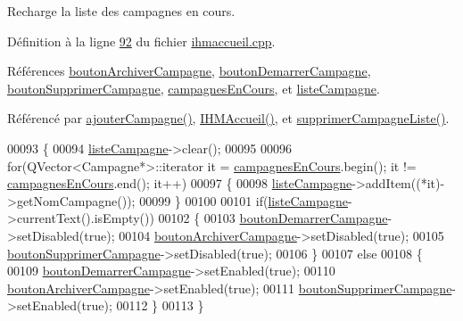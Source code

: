 Recharge la liste des campagnes en cours. 



Définition à la ligne \hyperlink{ihmaccueil_8cpp_source_l00092}{92} du fichier \hyperlink{ihmaccueil_8cpp_source}{ihmaccueil.\+cpp}.



Références \hyperlink{ihmaccueil_8h_source_l00035}{bouton\+Archiver\+Campagne}, \hyperlink{ihmaccueil_8h_source_l00034}{bouton\+Demarrer\+Campagne}, \hyperlink{ihmaccueil_8h_source_l00036}{bouton\+Supprimer\+Campagne}, \hyperlink{ihmaccueil_8h_source_l00039}{campagnes\+En\+Cours}, et \hyperlink{ihmaccueil_8h_source_l00037}{liste\+Campagne}.



Référencé par \hyperlink{ihmaccueil_8cpp_source_l00254}{ajouter\+Campagne()}, \hyperlink{ihmaccueil_8cpp_source_l00014}{I\+H\+M\+Accueil()}, et \hyperlink{ihmaccueil_8cpp_source_l00189}{supprimer\+Campagne\+Liste()}.


\begin{DoxyCode}
00093 \{
00094     \hyperlink{class_i_h_m_accueil_afb828a4e06c25afa40341c310cd85b08}{listeCampagne}->clear();
00095 
00096     \textcolor{keywordflow}{for}(QVector<Campagne*>::iterator it = \hyperlink{class_i_h_m_accueil_ad3827b81480eb201b5927c16a2ad1c46}{campagnesEnCours}.begin(); it != 
      \hyperlink{class_i_h_m_accueil_ad3827b81480eb201b5927c16a2ad1c46}{campagnesEnCours}.end(); it++)
00097     \{
00098         \hyperlink{class_i_h_m_accueil_afb828a4e06c25afa40341c310cd85b08}{listeCampagne}->addItem((*it)->getNomCampagne());
00099     \}
00100 
00101     \textcolor{keywordflow}{if}(\hyperlink{class_i_h_m_accueil_afb828a4e06c25afa40341c310cd85b08}{listeCampagne}->currentText().isEmpty())
00102     \{
00103         \hyperlink{class_i_h_m_accueil_a9fd8ab3abc0c1e6addd70c8d7c46fb65}{boutonDemarrerCampagne}->setDisabled(\textcolor{keyword}{true});
00104         \hyperlink{class_i_h_m_accueil_a96d64cf254c0645eb45c317858b0a0f3}{boutonArchiverCampagne}->setDisabled(\textcolor{keyword}{true});
00105         \hyperlink{class_i_h_m_accueil_afb409fb4395372f35f9f8699fcb4c89b}{boutonSupprimerCampagne}->setDisabled(\textcolor{keyword}{true});
00106     \}
00107     \textcolor{keywordflow}{else}
00108     \{
00109         \hyperlink{class_i_h_m_accueil_a9fd8ab3abc0c1e6addd70c8d7c46fb65}{boutonDemarrerCampagne}->setEnabled(\textcolor{keyword}{true});
00110         \hyperlink{class_i_h_m_accueil_a96d64cf254c0645eb45c317858b0a0f3}{boutonArchiverCampagne}->setEnabled(\textcolor{keyword}{true});
00111         \hyperlink{class_i_h_m_accueil_afb409fb4395372f35f9f8699fcb4c89b}{boutonSupprimerCampagne}->setEnabled(\textcolor{keyword}{true});
00112     \}
00113 \}
\end{DoxyCode}
\mbox{\label{class_i_h_m_accueil_a0ffb0f0c7c9c613083933514690f2772}} 
